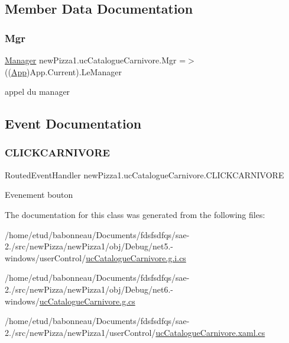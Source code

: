 \subsection{Member Data Documentation}
\mbox{\label{classnewPizza1_1_1ucCatalogueCarnivore_a8115b482f70d652cf39951cacf7f0385}} 
\subsubsection{\texorpdfstring{Mgr}{Mgr}}
{\footnotesize\ttfamily \hyperlink{classModele_1_1Manager}{Manager} new\+Pizza1.\+uc\+Catalogue\+Carnivore.\+Mgr =$>$ ((\hyperlink{classnewPizza1_1_1App}{App})App.\+Current).Le\+Manager}



appel du manager 



\subsection{Event Documentation}
\mbox{\label{classnewPizza1_1_1ucCatalogueCarnivore_aabd52f65bfac10cef62f30b909295d81}} 
\subsubsection{\texorpdfstring{C\+L\+I\+C\+K\+C\+A\+R\+N\+I\+V\+O\+RE}{CLICKCARNIVORE}}
{\footnotesize\ttfamily Routed\+Event\+Handler new\+Pizza1.\+uc\+Catalogue\+Carnivore.\+C\+L\+I\+C\+K\+C\+A\+R\+N\+I\+V\+O\+RE}



Evenement bouton 



The documentation for this class was generated from the following files\+:\begin{DoxyCompactItemize}
\item 
/home/etud/babonneau/\+Documents/fdsfsdfqs/sae-\/2./src/new\+Pizza/new\+Pizza1/obj/\+Debug/net5.-\/windows/user\+Control/\hyperlink{net5_80-windows_2userControl_2ucCatalogueCarnivore_8g_8i_8cs}{uc\+Catalogue\+Carnivore.\+g.\+i.\+cs}\item 
/home/etud/babonneau/\+Documents/fdsfsdfqs/sae-\/2./src/new\+Pizza/new\+Pizza1/obj/\+Debug/net6.-\/windows/\hyperlink{Debug_2net6_80-windows_2ucCatalogueCarnivore_8g_8cs}{uc\+Catalogue\+Carnivore.\+g.\+cs}\item 
/home/etud/babonneau/\+Documents/fdsfsdfqs/sae-\/2./src/new\+Pizza/new\+Pizza1/user\+Control/\hyperlink{ucCatalogueCarnivore_8xaml_8cs}{uc\+Catalogue\+Carnivore.\+xaml.\+cs}\end{DoxyCompactItemize}
